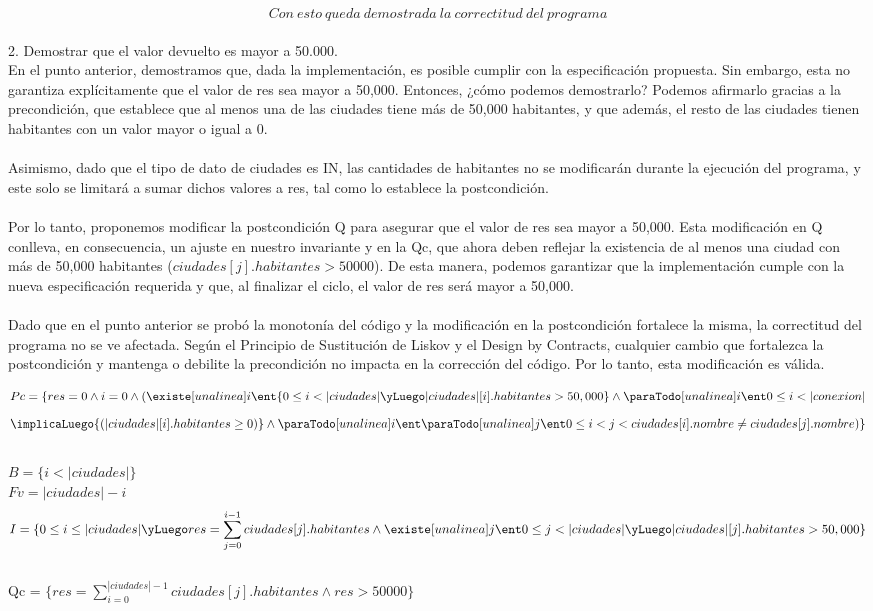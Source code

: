 \documentclass[10pt,a4paper]{article}
\begin{document}
\[Con \ esto\ queda\ demostrada\ la\ correctitud\ del\ programa\]
\vspace{15cm}\\
2. Demostrar que el valor devuelto es mayor a 50.000.
\vspace{0.3cm}\\
En el punto anterior, demostramos que, dada la implementación, es posible cumplir con la especificación propuesta. Sin embargo, esta no garantiza explícitamente que el valor de res sea mayor a 50,000. Entonces, ¿cómo podemos demostrarlo? Podemos afirmarlo gracias a la precondición, que establece que al menos una de las ciudades tiene más de 50,000 habitantes, y que además, el resto de las ciudades tienen habitantes con un valor mayor o igual a 0.\\ \\
Asimismo, dado que el tipo de dato de ciudades es IN, las cantidades de habitantes no se modificarán durante la ejecución del programa, y este solo se limitará a sumar dichos valores a res, tal como lo establece la postcondición.\\ \\
Por lo tanto, proponemos modificar la postcondición Q para asegurar que el valor de res sea mayor a 50,000. Esta modificación en Q conlleva, en consecuencia, un ajuste en nuestro invariante y en la Qc, que ahora deben reflejar la existencia de al menos una ciudad con más de 50,000 habitantes ($ciudades[j].habitantes > 50000$). De esta manera, podemos garantizar que la implementación cumple con la nueva especificación requerida y que, al finalizar el ciclo, el valor de res será mayor a 50,000. \\ \\
Dado que en el punto anterior se probó la monotonía del código y la modificación en la postcondición fortalece la misma, la correctitud del programa no se ve afectada. Según el Principio de Sustitución de Liskov y el Design by Contracts, cualquier cambio que fortalezca la postcondición y mantenga o debilite la precondición no impacta en la corrección del código. Por lo tanto, esta modificación es válida.


\[Pc = \{ res = 0 \land i = 0 \land (\existe[unalinea]i\ent {0\leq i<|ciudades| \yLuego |ciudades|[i].habitantes > 50,000} \land \\ \paraTodo[unalinea]i{\ent}{0 \leq i<|conexion|} \] \[ \implicaLuego {(|ciudades|[i].habitantes \geq 0) } \land
   \paraTodo[unalinea]i{\ent}{\paraTodo[unalinea]j{\ent}{0 \leq i < j<ciudades[i].nombre \neq ciudades[j].nombre}})\}   \] \\
$B = \{{i< |ciudades|}\} $ \\
$Fv = {|ciudades| - i}$ \\
\[I = \{{ 0 \leq i \leq |ciudades| \yLuego res = \sum\limits_{j=0}^{i-1}ciudades[j].habitantes \land \existe[unalinea]j{\ent}{0\leq j <|ciudades| \yLuego |ciudades|[j].habitantes > 50,000}}\}\]\\
Qc = $\{{res = \sum\limits_{i=0}^{|ciudades|-1}ciudades[j].habitantes \land res>50000}\}$\\ \\ \\
\end{document}
